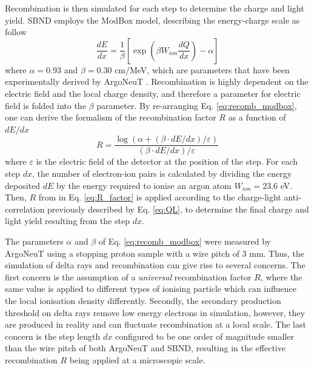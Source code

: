 Recombination is then simulated for each step to determine the charge and light yield.
SBND employs the ModBox model, describing the energy-charge scale as follow 
\begin{equation}
	\label{eq:recomb_modbox}
	\frac{dE}{dx} = \frac{1}{\beta}\left[ \exp{\left( \beta W_{ion}  \frac{dQ}{dx}\right)} -\alpha \right]
\end{equation}
where $\alpha = 0.93$ and $\beta = 0.30$ cm/MeV, which are parameters that have been experimentally derived by ArgoNeuT \cite{argoneut_recomb}.
Recombination is highly dependent on the electric field and the local charge density, and therefore a parameter for electric field is folded into the $\beta$ parameter.
By re-arranging Eq. \ref{eq:recomb_modbox}, one can derive the formalism of the recombination factor $R$ as a function of $dE/dx$
\begin{equation}
	\label{eq:R_factor}
	R = \frac{\log{ \left( \alpha + \left(\beta \cdot dE/dx\right)/\varepsilon \right)}}{\left(\beta \cdot dE/dx\right)/\varepsilon} 
\end{equation}
where $\varepsilon$ is the electric field of the detector at the position of the step.
For each step $dx$, the number of electron-ion pairs is calculated by dividing the energy deposited $dE$ by the energy required to ionise an argon atom $W_{ion} = 23.6$ eV. 
Then, $R$ from in Eq. \ref{eq:R_factor} is applied according to the charge-light anti-correlation previously described by Eq. \ref{eq:QL}, to determine the final charge and light yield resulting from the step $dx$.

The parameters $\alpha$ and $\beta$ of Eq. \ref{eq:recomb_modbox} were measured by ArgoNeuT using a stopping proton sample with a wire pitch of 3 mm.
Thus, the simulation of delta rays and recombination can give rise to several concerns.
The first concern is the assumption of a \textit{universal} recombination factor $R$, where the same value is applied to different types of ionising particle which can influence the local ionisation density differently. 
Secondly, the secondary production threshold on delta rays remove low energy electrons in simulation, however, they are produced in reality and can fluctuate recombination at a local scale. 
The last concern is the step length $dx$ configured to be one order of magnitude smaller than the wire pitch of both ArgoNeuT and SBND, resulting in the effective recombination $R$ being applied at a microscopic scale.

